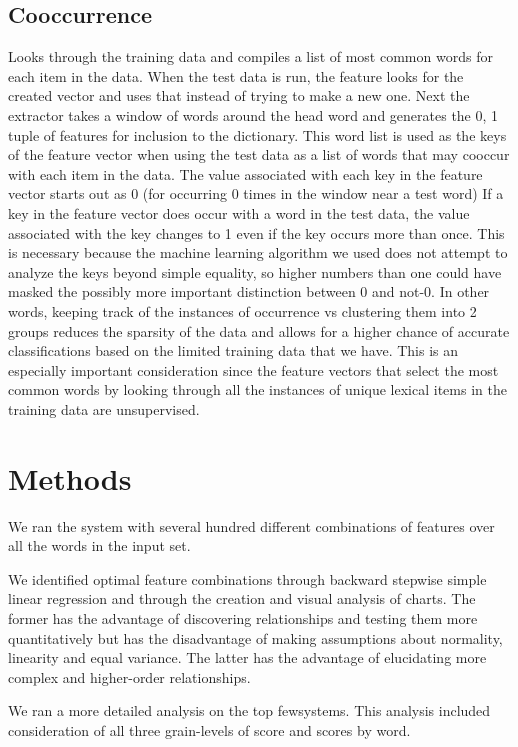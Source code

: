 \documentclass{article}
\begin{document}
\subsection{Cooccurrence}
Looks through the training data and compiles a list of most common words for each item in the data. When the test data is run, the feature looks for the created vector and uses that instead of trying to make a new one. Next the extractor takes a window of words around the head word and generates the 0, 1 tuple of features for inclusion to the dictionary. This word list is used as the keys of the feature vector when using the test data as a list of words that may cooccur with each item in the data. The value associated with each key in the feature vector starts out as 0 (for occurring 0 times in the window near a test word) If a key in the feature vector does occur with a word in the test data, the value associated with the key changes to 1 even if the key occurs more than once.  This is necessary because the machine learning algorithm we used does not attempt to analyze the keys beyond simple equality, so higher numbers than one could have masked the possibly more important distinction between 0 and not-0. In other words, keeping track of the instances of occurrence vs clustering them into 2 groups reduces the sparsity of the data and allows for a higher chance of accurate classifications based on the limited training data that we have. This is an especially important consideration since the feature vectors that select the most common words by looking through all the instances of unique lexical items in the training data are unsupervised.


\section{Methods}
\newcommand\few{few}
We ran the system with several hundred different combinations of features over all the words in the input set.

We identified optimal feature combinations through backward stepwise simple linear regression
and through the creation and visual analysis of charts. The former has the
advantage of discovering relationships and testing them more quantitatively
but has the disadvantage of making assumptions about normality, linearity and equal variance.
The latter has the advantage of elucidating more complex and higher-order relationships.

We ran a more detailed analysis on the top \few systems.
This analysis included consideration of all three grain-levels of score and scores by word.
\end{document}
